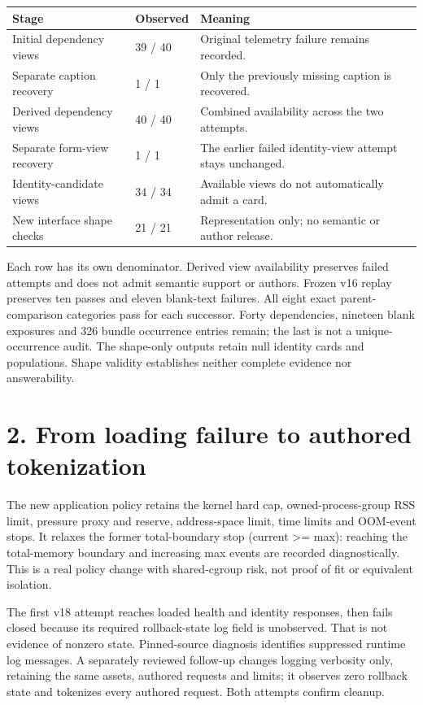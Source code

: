 \documentclass[10pt,a4paper]{article}
\begin{document}
\begin{longtable}{@{}p{}p{}p{}@{}}\toprule
\textbf{Stage} & \textbf{Observed} & \textbf{Meaning} \\ \midrule\endhead
Initial dependency views & 39 / 40 & Original telemetry failure remains recorded. \\
Separate caption recovery & 1 / 1 & Only the previously missing caption is recovered. \\
Derived dependency views & 40 / 40 & Combined availability across the two attempts. \\
Separate form-view recovery & 1 / 1 & The earlier failed identity-view attempt stays unchanged. \\
Identity-candidate views & 34 / 34 & Available views do not automatically admit a card. \\
New interface shape checks & 21 / 21 & Representation only; no semantic or author release. \\
\bottomrule\end{longtable}
{\small Each row has its own denominator. Derived view availability preserves failed attempts and does not admit semantic support or authors.}
Frozen v16 replay preserves ten passes and eleven blank-text failures. All eight exact parent-comparison categories pass for each successor. Forty dependencies, nineteen blank exposures and 326 bundle occurrence entries remain; the last is not a unique-occurrence audit. The shape-only outputs retain null identity cards and populations. Shape validity establishes neither complete evidence nor answerability.

\clearpage
\section*{2. From loading failure to authored tokenization}
The new application policy retains the kernel hard cap, owned-process-group RSS limit, pressure proxy and reserve, address-space limit, time limits and OOM-event stops. It relaxes the former total-boundary stop (current >= max): reaching the total-memory boundary and increasing max events are recorded diagnostically. This is a real policy change with shared-cgroup risk, not proof of fit or equivalent isolation.

The first v18 attempt reaches loaded health and identity responses, then fails closed because its required rollback-state log field is unobserved. That is not evidence of nonzero state. Pinned-source diagnosis identifies suppressed runtime log messages. A separately reviewed follow-up changes logging verbosity only, retaining the same assets, authored requests and limits; it observes zero rollback state and tokenizes every authored request. Both attempts confirm cleanup.
\end{document}
